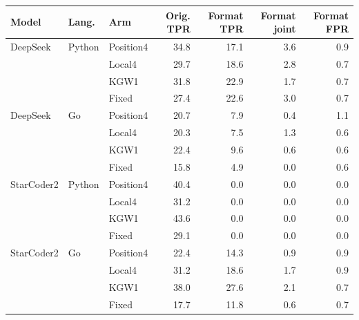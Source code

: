 \begin{tabular}{lllrrrr}
\toprule
Model & Lang. & Arm & Orig. TPR & Format TPR & Format joint & Format FPR \\
\midrule
DeepSeek & Python & Position4 & 34.8 & 17.1 & 3.6 & 0.9 \\
 &  & Local4 & 29.7 & 18.6 & 2.8 & 0.7 \\
 &  & KGW1 & 31.8 & 22.9 & 1.7 & 0.7 \\
 &  & Fixed & 27.4 & 22.6 & 3.0 & 0.7 \\
DeepSeek & Go & Position4 & 20.7 & 7.9 & 0.4 & 1.1 \\
 &  & Local4 & 20.3 & 7.5 & 1.3 & 0.6 \\
 &  & KGW1 & 22.4 & 9.6 & 0.6 & 0.6 \\
 &  & Fixed & 15.8 & 4.9 & 0.0 & 0.6 \\
StarCoder2 & Python & Position4 & 40.4 & 0.0 & 0.0 & 0.0 \\
 &  & Local4 & 31.2 & 0.0 & 0.0 & 0.0 \\
 &  & KGW1 & 43.6 & 0.0 & 0.0 & 0.0 \\
 &  & Fixed & 29.1 & 0.0 & 0.0 & 0.0 \\
StarCoder2 & Go & Position4 & 22.4 & 14.3 & 0.9 & 0.9 \\
 &  & Local4 & 31.2 & 18.6 & 1.7 & 0.9 \\
 &  & KGW1 & 38.0 & 27.6 & 2.1 & 0.7 \\
 &  & Fixed & 17.7 & 11.8 & 0.6 & 0.7 \\
\bottomrule
\end{tabular}
